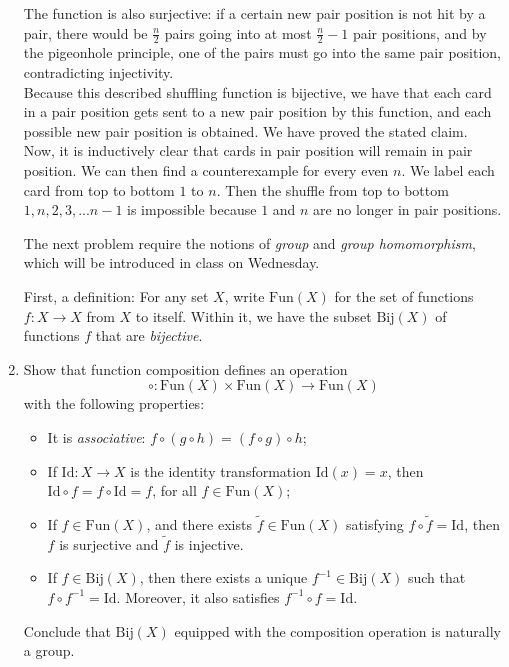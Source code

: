 \documentclass{amsart}
\begin{document}
\begin{enumerate}[itemsep=0.4in]
The function is also surjective: if a certain new pair position is not hit by a pair, there would be $\frac n2$ pairs going into at most $\frac n2-1$ pair positions, and by the pigeonhole principle, one of the pairs must go into the same pair position, contradicting injectivity.\\

Because this described shuffling function is bijective, we have that each card in a pair position gets sent to a new pair position by this function, and each possible new pair position is obtained. We have proved the stated claim.\\

Now, it is inductively clear that cards in pair position will remain in pair position. We can then find a counterexample for every even $n$. We label each card from top to bottom $1$ to $n$. Then the shuffle from top to bottom $1,n,2,3,...n-1$ is impossible because $1$ and $n$ are no longer in pair positions.\\


\vspace{2ex}

The next problem require the notions of \emph{group} and \emph{group homomorphism}, which will be introduced in class on Wednesday. 

First, a definition: For any set $X$, write $\mathrm{Fun}(X)$ for the set of functions $f:X\to X$ from $X$ to itself. Within it, we have the subset $\mathrm{Bij}(X)$ of functions $f$ that are \emph{bijective}.

\item Show that function composition defines an operation
\[
\circ: \mathrm{Fun}(X)\times \mathrm{Fun}(X) \to \mathrm{Fun}(X)
\]
with the following properties:
\begin{itemize}
	\item  It is \emph{associative}: $f\circ (g\circ h) = (f\circ g)\circ h$;
	\item If $\mathrm{Id}:X\to X$ is the identity transformation $\mathrm{Id}(x) = x$, then $\mathrm{Id}\circ f = f\circ \mathrm{Id} = f$, for all $f\in \mathrm{Fun}(X)$;
	\item If $f\in \mathrm{Fun}(X)$, and there exists $\tilde{f}\in \mathrm{Fun}(X)$ satisfying $f\circ \tilde{f} = \mathrm{Id}$, then $f$ is surjective and $\tilde{f}$ is injective.
	\item If $f\in \mathrm{Bij}(X)$, then there exists a unique $f^{-1}\in \mathrm{Bij}(X)$ such that $f\circ f^{-1} = \mathrm{Id}$. Moreover, it also satisfies $f^{-1}\circ f = \mathrm{Id}$.
\end{itemize}
Conclude that $\mathrm{Bij}(X)$ equipped with the composition operation is naturally a group.\\


\end{enumerate}
\end{document}
